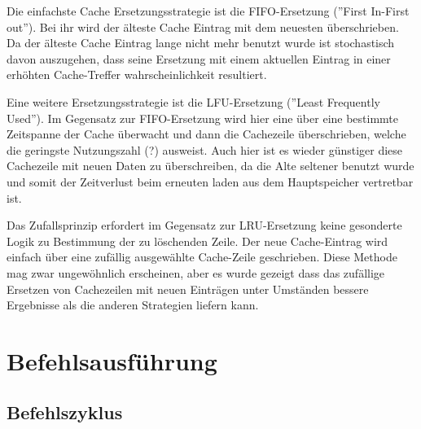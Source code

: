 \documentclass[12pt]{article}
\begin{document}
Die einfachste Cache Ersetzungsstrategie ist die FIFO-Ersetzung (''First In-First out''). Bei ihr wird der älteste Cache Eintrag mit dem neuesten überschrieben. Da der älteste Cache Eintrag lange nicht mehr benutzt wurde ist stochastisch davon auszugehen, dass seine Ersetzung mit einem aktuellen Eintrag in einer erhöhten Cache-Treffer wahrscheinlichkeit resultiert.

Eine weitere Ersetzungsstrategie ist die LFU-Ersetzung (''Least Frequently Used''). Im Gegensatz zur FIFO-Ersetzung wird hier eine über eine bestimmte Zeitspanne der Cache überwacht und dann die Cachezeile überschrieben, welche die geringste Nutzungszahl (?) ausweist. Auch hier ist es wieder günstiger diese Cachezeile mit neuen Daten zu überschreiben, da die Alte seltener benutzt wurde und somit der Zeitverlust beim erneuten laden aus dem Hauptspeicher vertretbar ist.

Das Zufallsprinzip erfordert im Gegensatz zur LRU-Ersetzung keine gesonderte Logik zu Bestimmung der zu löschenden Zeile. Der neue Cache-Eintrag wird einfach über eine zufällig ausgewählte Cache-Zeile geschrieben. Diese Methode mag zwar ungewöhnlich erscheinen, aber es wurde gezeigt dass das zufällige Ersetzen von Cachezeilen mit neuen Einträgen unter Umständen bessere Ergebnisse als die anderen Strategien liefern kann.\cite{mikroprozessortechnik2011} \cite{smith1985instruction}


\section{Befehlsausführung}

\subsection{Befehlszyklus}
\end{document}
